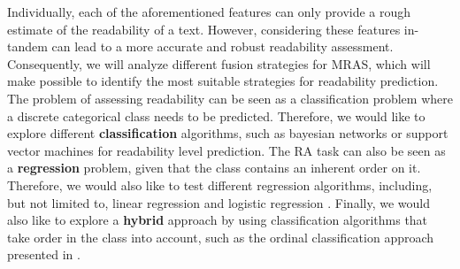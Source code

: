 \documentclass[12pt]{article}
\begin{document}
Individually, each of the aforementioned features can only provide a rough estimate of the readability of a text. However, considering these features in-tandem can lead to a more accurate and robust readability assessment. Consequently, we will analyze different fusion strategies for MRAS, which will make possible to identify the most suitable strategies for readability prediction. The problem of assessing readability can be seen as a classification problem where a discrete categorical class needs to be predicted. Therefore, we would like to  explore different \textbf{classification} algorithms, such as bayesian networks \cite{nielsen2009bayesian} or support vector machines \cite{cortes1995support} for readability level prediction.  The RA task can also be seen as a \textbf{regression} problem, given that the class contains an inherent order on it. Therefore, we would also like to test different regression algorithms, including, but not limited to, linear regression \cite{neter1996applied} and logistic regression \cite{walker1967estimation}. Finally, we would also like to  explore a \textbf{hybrid} approach by using classification algorithms that take order in the class into account, such as the ordinal classification approach presented in \cite{frank2001simple}.
\end{document}
